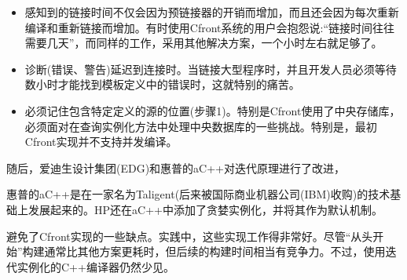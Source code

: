 \begin{itemize}
\item 
感知到的链接时间不仅会因为预链接器的开销而增加，而且还会因为每次重新编译和重新链接而增加。有时使用Cfront系统的用户会抱怨说:“链接时间往往需要几天”，而同样的工作，采用其他解决方案，一个小时左右就足够了。

\item 
诊断(错误、警告)延迟到连接时。当链接大型程序时，并且开发人员必须等待数小时才能找到模板定义中的错误时，这就特别的痛苦。

\item 
必须记住包含特定定义的源的位置(步骤1)。特别是Cfront使用了中央存储库，必须面对在查询实例化方法中处理中央数据库的一些挑战。特别是，最初Cfront实现并不支持并发编译。
\end{itemize}

随后，爱迪生设计集团(EDG)和惠普的aC++对迭代原理进行了改进，

\begin{notice}惠普的aC++是在一家名为Taligent(后来被国际商业机器公司(IBM)收购)的技术基础上发展起来的。HP还在aC++中添加了贪婪实例化，并将其作为默认机制。
\end{notice}

避免了Cfront实现的一些缺点。实践中，这些实现工作得非常好。尽管“从头开始”构建通常比其他方案更耗时，但后续的构建时间相当有竞争力。不过，使用迭代实例化的C++编译器仍然少见。
















